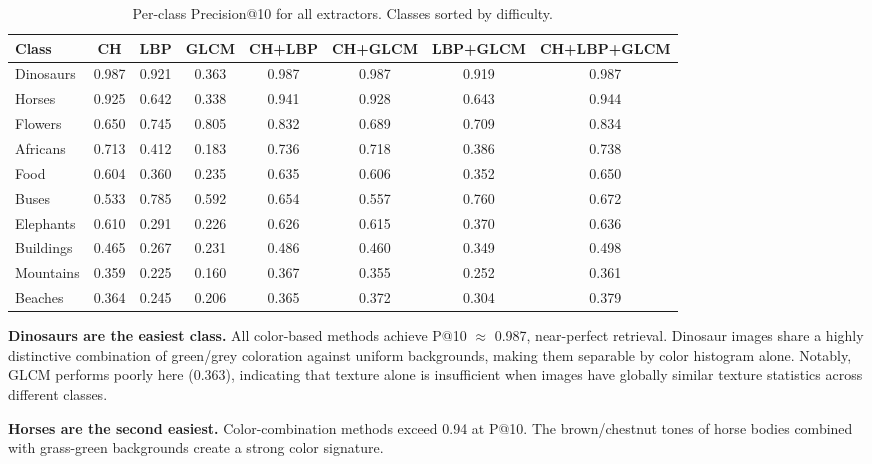 \documentclass[12pt, a4paper]{article}
\begin{document}
\begin{table}[h]
    \centering
    \caption{Per-class Precision@10 for all extractors. Classes sorted by difficulty.}
    \label{tab:perclass}
    \setlength{\tabcolsep}{5pt}
    \begin{tabular}{@{}lccccccc@{}}
        \toprule
        \textbf{Class} &
        \textbf{CH} &
        \textbf{LBP} &
        \textbf{GLCM} &
        \textbf{CH+LBP} &
        \textbf{CH+GLCM} &
        \textbf{LBP+GLCM} &
        \textbf{CH+LBP+GLCM} \\
        \midrule
        Dinosaurs    & 0.987 & 0.921 & 0.363 & 0.987 & 0.987 & 0.919 & 0.987 \\
        Horses       & 0.925 & 0.642 & 0.338 & 0.941 & 0.928 & 0.643 & 0.944 \\
        Flowers      & 0.650 & 0.745 & 0.805 & 0.832 & 0.689 & 0.709 & 0.834 \\
        Africans     & 0.713 & 0.412 & 0.183 & 0.736 & 0.718 & 0.386 & 0.738 \\
        Food         & 0.604 & 0.360 & 0.235 & 0.635 & 0.606 & 0.352 & 0.650 \\
        Buses        & 0.533 & 0.785 & 0.592 & 0.654 & 0.557 & 0.760 & 0.672 \\
        Elephants    & 0.610 & 0.291 & 0.226 & 0.626 & 0.615 & 0.370 & 0.636 \\
        Buildings    & 0.465 & 0.267 & 0.231 & 0.486 & 0.460 & 0.349 & 0.498 \\
        Mountains    & 0.359 & 0.225 & 0.160 & 0.367 & 0.355 & 0.252 & 0.361 \\
        Beaches      & 0.364 & 0.245 & 0.206 & 0.365 & 0.372 & 0.304 & 0.379 \\
        \bottomrule
    \end{tabular}
\end{table}

\textbf{Dinosaurs are the easiest class.} All color-based methods achieve P@10 $\approx$
0.987, near-perfect retrieval. Dinosaur images share a highly distinctive combination of
green/grey coloration against uniform backgrounds, making them separable by color histogram
alone. Notably, GLCM performs poorly here (0.363), indicating that texture alone is
insufficient when images have globally similar texture statistics across different classes.

\textbf{Horses are the second easiest.} Color-combination methods exceed 0.94 at P@10.
The brown/chestnut tones of horse bodies combined with grass-green backgrounds create a
strong color signature.
\end{document}
